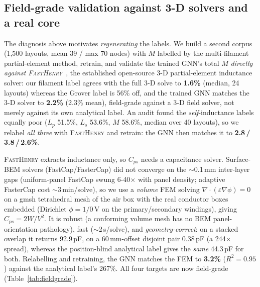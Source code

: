 \documentclass[letterpaper,twocolumn,9pt]{extarticle}
\begin{document}
\subsection{Field-grade validation against 3-D solvers and a real core}
\label{sec:fieldgrade}
The diagnosis above motivates \emph{regenerating} the labels. We build a second
corpus (1{,}500 layouts, mean 39 / max 70 nodes) with $M$ labelled by the
multi-filament partial-element method, retrain, and validate the trained GNN's
total $M$ \emph{directly against \textsc{FastHenry}}~\cite{fasthenry}, the
established open-source 3-D partial-element inductance solver: our filament label
agrees with the full 3-D solve to \textbf{1.6\%} (median, 24 layouts) whereas the
Grover label is 56\% off, and the trained GNN matches the 3-D solver to
\textbf{2.2\%} (2.3\% mean), field-grade against a 3-D field solver, not merely
against its own analytical label. An audit found the \emph{self}-inductance labels
equally poor ($L_p$ 51.5\%, $L_s$ 53.6\%, $M$ 58.6\%, median over 40 layouts),
so we relabel \emph{all three} with \textsc{FastHenry} and retrain: the GNN then
matches it to \textbf{2.8\,/\,3.8\,/\,2.6\%}.

\textsc{FastHenry} extracts inductance only, so $C_{ps}$ needs a capacitance
solver. Surface-BEM solvers (FastCap/FasterCap) did not converge on the
$\sim$0.1\,mm inter-layer gaps (uniform-panel FastCap swung 6-40$\times$ with
panel density; adaptive FasterCap cost $\sim$3\,min/solve), so we use a
\emph{volume} FEM solving $\nabla\!\cdot\!(\varepsilon\nabla\phi)=0$ on a gmsh
tetrahedral mesh of the air box with the real conductor boxes embedded (Dirichlet
$\phi=1/0$\,V on the primary/secondary windings), giving $C_{ps}=2W/V^2$. It is
robust (a conforming volume mesh has no BEM panel-orientation pathology), fast
($\sim$2\,s/solve), and \emph{geometry-correct}: on a stacked overlap it returns
92.9\,pF, on a 60\,mm-offset disjoint pair 0.38\,pF (a 244$\times$ spread),
whereas the position-blind analytical label gives the \emph{same} 44.3\,pF for
both. Relabelling and retraining, the GNN matches the FEM to \textbf{3.2\%}
($R^2=0.95$) against the analytical label's 267\%. All four targets are now
field-grade (Table~\ref{tab:fieldgrade}).
\end{document}
